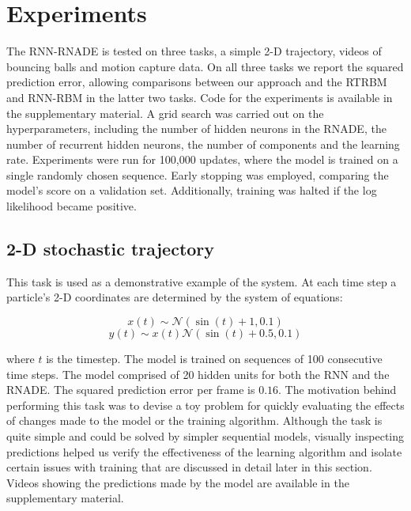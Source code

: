 \documentclass{article} %
\begin{document}
\section{Experiments}
\label{Experiments}
The RNN-RNADE is tested on three tasks, a simple 2-D trajectory, videos of bouncing balls and motion capture data. On all three tasks we report the squared prediction error, allowing comparisons between our approach and the RTRBM and RNN-RBM in the latter two tasks. Code for the experiments is available in the supplementary material.  A grid search was carried out on the hyperparameters, including the number of hidden neurons in the RNADE, the number of recurrent hidden neurons, the number of components and the learning rate. Experiments were run for 100,000 updates, where the model is trained on a single randomly chosen sequence. Early stopping was employed, comparing the model's score on a validation set. Additionally, training was halted if the log likelihood became positive.


\subsection{2-D stochastic trajectory}
This task is used as a demonstrative example of the system. At each time step a particle's 2-D coordinates are determined by the system of equations:


$$x(t) \sim \mathcal{N}(\sin(t)+1,0.1) $$
$$ y(t) \sim x(t)\mathcal{N}(\sin(t)+0.5,0.1)$$


where $t$ is the timestep. The model is trained on sequences of 100 consecutive time steps. The model comprised of 20 hidden units for both the RNN and the RNADE. The squared prediction error per frame is $\mathbf{0.16}$. The motivation behind performing this task was to devise a toy problem for quickly evaluating the effects of changes made to the model or the training algorithm. Although the task is quite simple and could be solved by simpler sequential models, visually inspecting predictions helped us verify the effectiveness of the learning algorithm and isolate certain issues with training that are discussed in detail later in this section. Videos showing the predictions made by the model are available in the supplementary material. 
\end{document}
